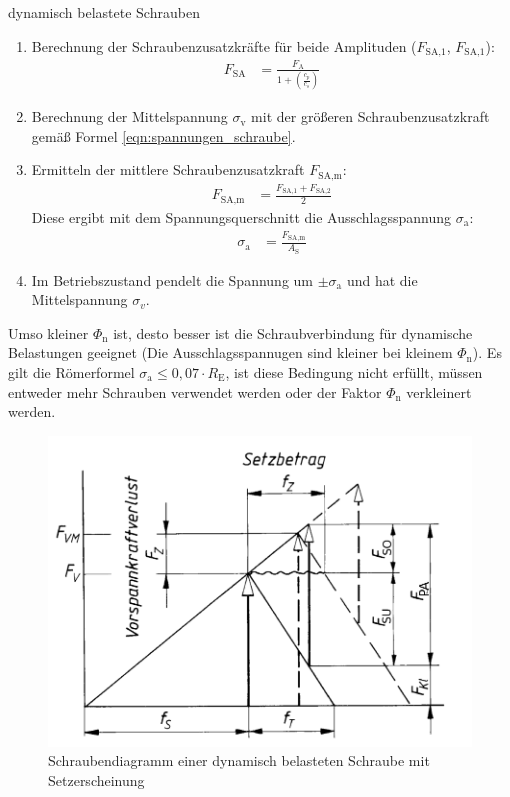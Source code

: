 \begin{eeqn}{dynamisch belastete Schrauben}
	\begin{enumerate}[itemsep=0mm,leftmargin=12pt]
	\item Berechnung der Schraubenzusatzkräfte für beide Amplituden ($F_\text{SA,1}$, $F_\text{SA,1}$):
	\begin{align}
		F_\text{SA} &= \frac{F_\text{A}}{1 + \left( \frac{c_p}{c_s} \right)} 
	\end{align}
	\item Berechnung der Mittelspannung $\sigma_\text{v}$ mit der größeren Schraubenzusatzkraft gemäß Formel \ref{eqn:spannungen_schraube}.
	\item Ermitteln der mittlere Schraubenzusatzkraft $F_\text{SA,m}$:
	\begin{align}
		F_\text{SA,m} &= \frac{F_\text{SA,1} + F_\text{SA,2}}{2}
	\end{align}
	Diese ergibt mit dem Spannungsquerschnitt die Ausschlagsspannung $\sigma_\text{a}$:
	\begin{align}
		\sigma_\text{a} &= \frac{F_\text{SA,m}}{A_\text{S}}
	\end{align}
	\item Im Betriebszustand pendelt die Spannung um $\pm \sigma_\text{a}$ und hat die Mittelspannung $\sigma_{v}$.
	\end{enumerate}
	Umso kleiner $\Phi_\text{n}$ ist, desto besser ist die Schraubverbindung für dynamische Belastungen geeignet (Die Ausschlagsspannugen sind kleiner bei kleinem $\Phi_\text{n}$).
	Es gilt die Römerformel $\sigma_\text{a} \le 0,07 \cdot R_\text{E}$, ist diese Bedingung nicht erfüllt, müssen entweder mehr Schrauben verwendet werden oder der Faktor $\Phi_\text{n}$ verkleinert werden. \\
\end{eeqn}

\begin{figure}[H]
	\centering
	\includegraphics[width=0.8\linewidth]{schrauben/schraubendiagramm}
	\caption*{Schraubendiagramm einer dynamisch belasteten Schraube mit Setzerscheinung}
\end{figure}


